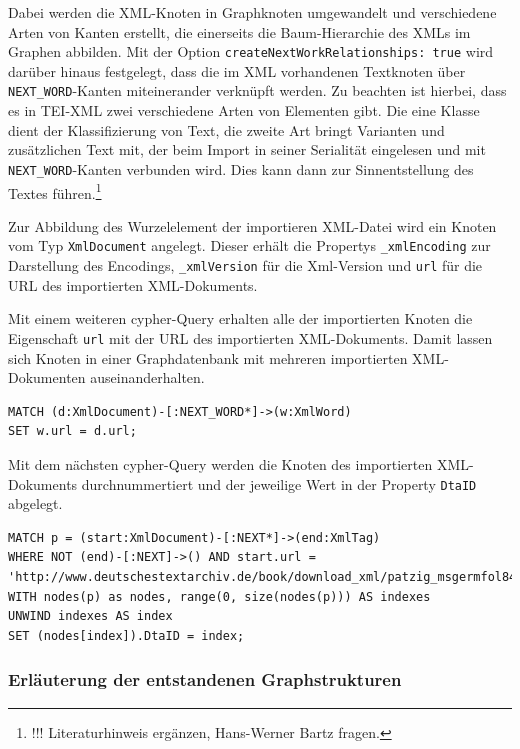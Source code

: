 \documentclass[ngerman,]{scrreprt}
\begin{document}
Dabei werden die XML-Knoten in Graphknoten umgewandelt und verschiedene Arten von Kanten erstellt, die einerseits die Baum-Hierarchie des XMLs im Graphen abbilden. Mit der Option \texttt{createNextWorkRelationships:\ true} wird darüber hinaus festgelegt, dass die im XML vorhandenen Textknoten über \texttt{NEXT\_WORD}-Kanten miteinerander verknüpft werden. Zu beachten ist hierbei, dass es in TEI-XML zwei verschiedene Arten von Elementen gibt. Die eine Klasse dient der Klassifizierung von Text, die zweite Art bringt Varianten und zusätzlichen Text mit, der beim Import in seiner Serialität eingelesen und mit \texttt{NEXT\_WORD}-Kanten verbunden wird. Dies kann dann zur Sinnentstellung des Textes führen.\footnote{!!! Literaturhinweis ergänzen, Hans-Werner Bartz fragen.}

Zur Abbildung des Wurzelelement der importieren XML-Datei wird ein Knoten vom Typ \texttt{XmlDocument} angelegt. Dieser erhält die Propertys \texttt{\_xmlEncoding} zur Darstellung des Encodings, \texttt{\_xmlVersion} für die Xml-Version und \texttt{url} für die URL des importierten XML-Dokuments.

Mit einem weiteren cypher-Query erhalten alle der importierten Knoten die Eigenschaft \texttt{url} mit der URL des importierten XML-Dokuments. Damit lassen sich Knoten in einer Graphdatenbank mit mehreren importierten XML-Dokumenten auseinanderhalten.

\begin{verbatim}
MATCH (d:XmlDocument)-[:NEXT_WORD*]->(w:XmlWord)
SET w.url = d.url;
\end{verbatim}

Mit dem nächsten cypher-Query werden die Knoten des importierten XML-Dokuments durchnummertiert und der jeweilige Wert in der Property \texttt{DtaID} abgelegt.

\begin{verbatim}
MATCH p = (start:XmlDocument)-[:NEXT*]->(end:XmlTag)
WHERE NOT (end)-[:NEXT]->() AND start.url =  'http://www.deutschestextarchiv.de/book/download_xml/patzig_msgermfol841842_1828'
WITH nodes(p) as nodes, range(0, size(nodes(p))) AS indexes
UNWIND indexes AS index
SET (nodes[index]).DtaID = index;
\end{verbatim}

\subsubsection{Erläuterung der entstandenen Graphstrukturen}\label{erluxe4uterung-der-entstandenen-graphstrukturen}
\end{document}
